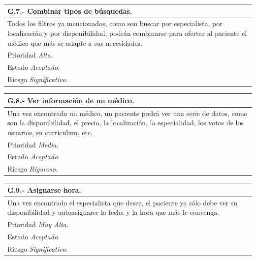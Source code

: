 \documentclass[a4paper,oneside,11pt]{book}
\begin{document}
\begin{center}
\begin{tabulary}{15cm}{|L|}
	\hline
		\bf{G.7.- Combinar tipos de búsquedas.} \\
	\hline
		Todos los filtros ya mencionados, como son buscar por especialista, por localización y por disponibilidad, podrán combinarse para ofertar al paciente el médico que más se adapte a sus necesidades. \\
	\hline
		Prioridad \textit{Alta.} \\
	\hline
		Estado \textit{Aceptado.} \\
	\hline
		Riesgo \textit{Significativo.} \\
	\hline
\end{tabulary}
\end{center}

\begin{center}
\begin{tabulary}{15cm}{|L|}
	\hline
		\bf{G.8.- Ver información de un médico.} \\
	\hline
		Una vez encontrado un médico, un paciente podrá ver una serie de datos, como son la disponibilidad, el precio, la localización, la especialidad, los votos de los usuarios, su curriculum, etc. \\
	\hline
		Prioridad \textit{Media.} \\
	\hline
		Estado \textit{Aceptado.} \\
	\hline
		Riesgo \textit{Riguroso.} \\
	\hline
\end{tabulary}
\end{center}

\begin{center}
\begin{tabulary}{15cm}{|L|}
	\hline
		\bf{G.9.- Asignarse hora.} \\
	\hline
		Una vez encontrado el especialista que desee, el paciente ya sólo debe ver su disponibilidad y autoasignarse la fecha y la hora que más le convenga. \\
	\hline
		Prioridad \textit{Muy Alta.} \\
	\hline
		Estado \textit{Aceptado.} \\
	\hline
		Riesgo \textit{Significativo.} \\
	\hline
\end{tabulary}
\end{center}
\end{document}
